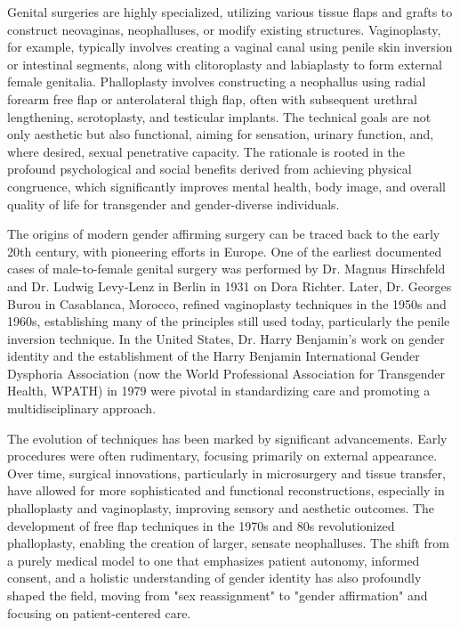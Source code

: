 Genital surgeries are highly specialized, utilizing various tissue flaps and grafts to construct neovaginas, neophalluses, or modify existing structures. Vaginoplasty, for example, typically involves creating a vaginal canal using penile skin inversion or intestinal segments, along with clitoroplasty and labiaplasty to form external female genitalia. Phalloplasty involves constructing a neophallus using radial forearm free flap or anterolateral thigh flap, often with subsequent urethral lengthening, scrotoplasty, and testicular implants. The technical goals are not only aesthetic but also functional, aiming for sensation, urinary function, and, where desired, sexual penetrative capacity. The rationale is rooted in the profound psychological and social benefits derived from achieving physical congruence, which significantly improves mental health, body image, and overall quality of life for transgender and gender-diverse individuals.

The origins of modern gender affirming surgery can be traced back to the early 20th century, with pioneering efforts in Europe. One of the earliest documented cases of male-to-female genital surgery was performed by Dr. Magnus Hirschfeld and Dr. Ludwig Levy-Lenz in Berlin in 1931 on Dora Richter. Later, Dr. Georges Burou in Casablanca, Morocco, refined vaginoplasty techniques in the 1950s and 1960s, establishing many of the principles still used today, particularly the penile inversion technique. In the United States, Dr. Harry Benjamin's work on gender identity and the establishment of the Harry Benjamin International Gender Dysphoria Association (now the World Professional Association for Transgender Health, WPATH) in 1979 were pivotal in standardizing care and promoting a multidisciplinary approach.

The evolution of techniques has been marked by significant advancements. Early procedures were often rudimentary, focusing primarily on external appearance. Over time, surgical innovations, particularly in microsurgery and tissue transfer, have allowed for more sophisticated and functional reconstructions, especially in phalloplasty and vaginoplasty, improving sensory and aesthetic outcomes. The development of free flap techniques in the 1970s and 80s revolutionized phalloplasty, enabling the creation of larger, sensate neophalluses. The shift from a purely medical model to one that emphasizes patient autonomy, informed consent, and a holistic understanding of gender identity has also profoundly shaped the field, moving from "sex reassignment" to "gender affirmation" and focusing on patient-centered care.

